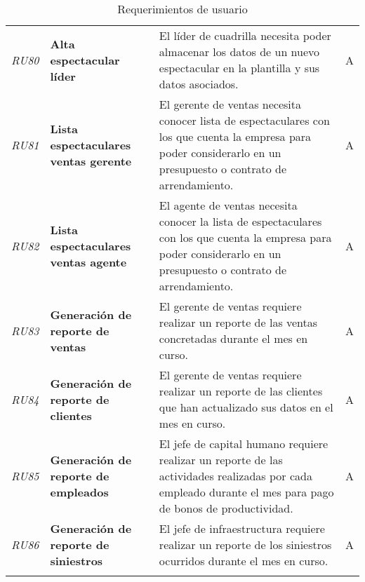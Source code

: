 \begin{longtable}[H]{m{1cm}m{3cm}m{10cm}m{1cm}}
\textit{RU80} & \textbf{Alta espectacular líder} & El líder de cuadrilla necesita poder almacenar los datos de un nuevo espectacular en la plantilla y sus datos asociados. & A\tabularnewline
\textit{RU81} & \textbf{Lista espectaculares ventas gerente} & El gerente de ventas necesita conocer lista de espectaculares con los que cuenta la empresa para poder considerarlo en un presupuesto o contrato de arrendamiento. & A\tabularnewline
\textit{RU82} & \textbf{Lista espectaculares ventas agente} & El agente de ventas necesita conocer la lista de espectaculares con los que cuenta la empresa para poder considerarlo en un presupuesto o contrato de arrendamiento. & A\tabularnewline
\textit{RU83} & \textbf{Generación de reporte de ventas} & El gerente de ventas requiere realizar un reporte de las ventas concretadas durante el mes en curso. & A\tabularnewline
\textit{RU84} & \textbf{Generación de reporte de clientes} & El gerente de ventas requiere realizar un reporte de las clientes que han actualizado sus datos en el mes en curso. & A\tabularnewline
\textit{RU85} & \textbf{Generación de reporte de empleados} & El jefe de capital humano requiere realizar un reporte de las actividades realizadas por cada empleado durante el mes para pago de bonos de productividad. & A\tabularnewline
\textit{RU86} & \textbf{Generación de reporte de siniestros} & El jefe de infraestructura requiere realizar un reporte de los siniestros ocurridos durante el mes en curso. & A\tabularnewline
\bottomrule
\caption{Requerimientos de usuario}
\label{tbl:listaRU}

\end{longtable}
